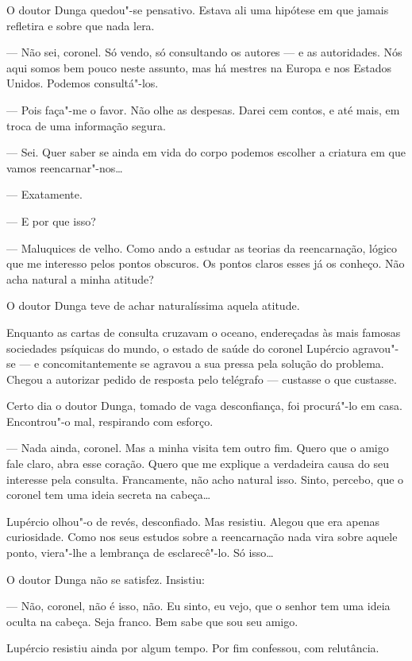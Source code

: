 O doutor Dunga quedou"-se pensativo. Estava ali uma hipótese em que
jamais refletira e sobre que nada lera.

--- Não sei, coronel. Só vendo, só consultando os autores --- e as
autoridades. Nós aqui somos bem pouco neste assunto, mas há mestres na
Europa e nos Estados Unidos. Podemos consultá"-los.

--- Pois faça"-me o favor. Não olhe as despesas. Darei cem contos, e até
mais, em troca de uma informação segura.

--- Sei. Quer saber se ainda em vida do corpo podemos escolher a
criatura em que vamos reencarnar"-nos\ldots{}

--- Exatamente.

--- E por que isso?

--- Maluquices de velho. Como ando a estudar as teorias da reencarnação,
lógico que me interesso pelos pontos obscuros. Os pontos claros esses já
os conheço. Não acha natural a minha atitude?

O doutor Dunga teve de achar naturalíssima aquela atitude.

Enquanto as cartas de consulta cruzavam o oceano, endereçadas às mais
famosas sociedades psíquicas do mundo, o estado de saúde do coronel
Lupércio agravou"-se --- e concomitantemente se agravou a sua pressa pela
solução do problema. Chegou a autorizar pedido de resposta pelo
telégrafo --- custasse o que custasse.

Certo dia o doutor Dunga, tomado de vaga desconfiança, foi procurá"-lo em
casa. Encontrou"-o mal, respirando com esforço.

--- Nada ainda, coronel. Mas a minha visita tem outro fim. Quero que o
amigo fale claro, abra esse coração. Quero que me explique a verdadeira
causa do seu interesse pela consulta. Francamente, não acho natural
isso. Sinto, percebo, que o coronel tem uma ideia secreta na cabeça\ldots{}

Lupércio olhou"-o de revés, desconfiado. Mas resistiu. Alegou que era
apenas curiosidade. Como nos seus estudos sobre a reencarnação nada vira
sobre aquele ponto, viera"-lhe a lembrança de esclarecê"-lo. Só isso\ldots{}

O doutor Dunga não se satisfez. Insistiu:

--- Não, coronel, não é isso, não. Eu sinto, eu vejo, que o senhor tem
uma ideia oculta na cabeça. Seja franco. Bem sabe que sou seu amigo.

Lupércio resistiu ainda por algum tempo. Por fim confessou, com
relutância.

